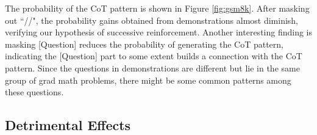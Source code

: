 \documentclass{article} %
\def\elliott#1{{\color{cyan}{\bf [Elliott:} {{#1}}{\bf ]}}}
\begin{document}
The probability of the CoT pattern is shown in Figure \ref{fig:gsm8k}. 
After masking out ``//", the probability gains obtained from demonstrations almost diminish, verifying our hypothesis of successive reinforcement.
Another interesting finding is masking [Question] reduces the probability of generating the CoT pattern, indicating the [Question] part to some extent builds a connection with the CoT pattern. 
Since the questions in demonstrations are different but lie in the same group of grad math problems, there might be some common patterns among these questions. 












\subsection{Detrimental Effects}
\end{document}
